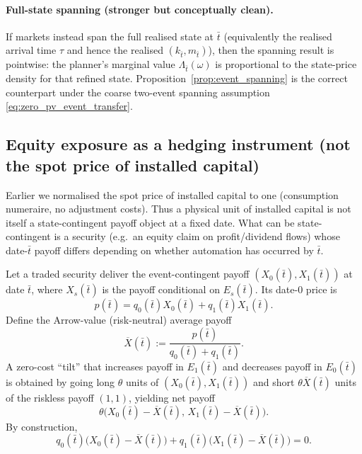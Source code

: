 \documentclass{article}
\begin{document}
\paragraph{Full-state spanning (stronger but conceptually clean).}
If markets instead span the full realised state at $\bar t$ (equivalently the realised arrival time $\tau$ and hence the realised $(k_{\bar t},m_{\bar t})$), then the spanning result is pointwise: the planner's marginal value $\Lambda_{\bar t}(\omega)$ is proportional to the state-price density for that refined state. Proposition~\ref{prop:event_spanning} is the correct counterpart under the coarse two-event spanning assumption \eqref{eq:zero_pv_event_transfer}.

\subsection{Equity exposure as a hedging instrument (not the spot price of installed capital)}
\label{sec:mvpf_hedging}

Earlier we normalised the spot price of installed capital to one (consumption numeraire, no adjustment costs). Thus a physical unit of installed capital is not itself a state-contingent payoff object at a fixed date. What can be state-contingent is a security (e.g.\ an equity claim on profit/dividend flows) whose date-$\bar t$ payoff differs depending on whether automation has occurred by $\bar t$.

Let a traded security deliver the event-contingent payoff $(X_0(\bar t),X_1(\bar t))$ at date $\bar t$, where $X_s(\bar t)$ is the payoff conditional on $E_s(\bar t)$. Its date-$0$ price is
\begin{equation}
\label{eq:security_price}
p(\bar t)=q_0(\bar t)X_0(\bar t)+q_1(\bar t)X_1(\bar t).
\end{equation}
Define the Arrow-value (risk-neutral) average payoff
\begin{equation}
\label{eq:arrow_value_avg}
\overline X(\bar t):=\frac{p(\bar t)}{q_0(\bar t)+q_1(\bar t)}.
\end{equation}
A zero-cost ``tilt'' that increases payoff in $E_1(\bar t)$ and decreases payoff in $E_0(\bar t)$ is obtained by going long $\theta$ units of $(X_0(\bar t),X_1(\bar t))$ and short $\theta \overline X(\bar t)$ units of the riskless payoff $(1,1)$, yielding net payoff
\begin{equation}
\label{eq:tilt_payoff}
\theta\Big(X_0(\bar t)-\overline X(\bar t),\,X_1(\bar t)-\overline X(\bar t)\Big).
\end{equation}
By construction,
\begin{equation}
\label{eq:tilt_zero_cost}
q_0(\bar t)\Big(X_0(\bar t)-\overline X(\bar t)\Big)+q_1(\bar t)\Big(X_1(\bar t)-\overline X(\bar t)\Big)=0.
\end{equation}
\end{document}
